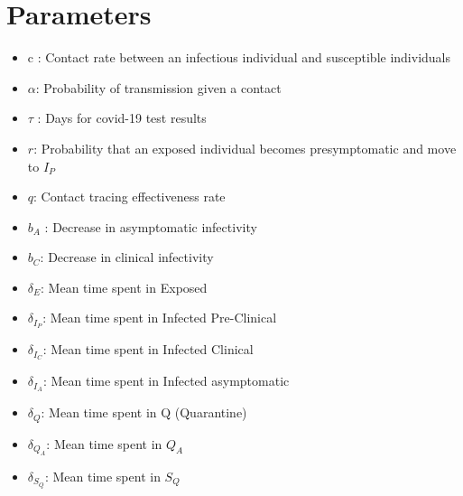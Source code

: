 \documentclass[12pt]{article}
\begin{document}
\section{Parameters} \label{parameters}
\begin{itemize}
\item c : Contact rate between an infectious individual and susceptible individuals
\item $\alpha$: Probability of transmission given a contact
\item $\tau$ : Days for covid-19 test results
\item $r$: Probability that an exposed individual becomes presymptomatic and move to $I_P$
\item $q$: Contact tracing effectiveness rate
\item  $b_A$ : Decrease in asymptomatic infectivity
\item $b_C$: Decrease in clinical infectivity
\item $\delta_E$: Mean time spent in Exposed
\item $\delta_{I_{P}}$: Mean time spent in Infected Pre-Clinical
\item $\delta_{I_{C}}$: Mean time spent in Infected Clinical
\item $\delta_{I_{A}}$: Mean time spent in Infected asymptomatic
\item $\delta_Q$: Mean time spent in Q (Quarantine)
\item $\delta_{Q_{A}}$: Mean time spent in $Q_A$
\item $\delta_{S_{Q}}$: Mean time spent in $S_Q$
\end{itemize}
\end{document}
